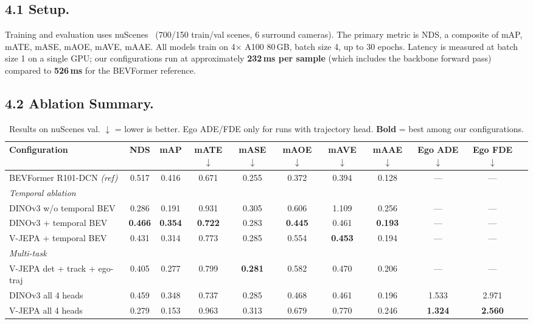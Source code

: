 \documentclass[12pt]{article}
\begin{document}
\subsection{4.1 Setup.}
Training and evaluation uses nuScenes~\cite{nuscenes} (700/150 train/val scenes, 6 surround cameras). The primary metric is NDS, a composite of mAP, mATE, mASE, mAOE, mAVE, mAAE. All models train on 4$\times$ A100 80\,GB, batch size 4, up to 30 epochs. Latency is measured at batch size 1 on a single GPU; our configurations run at approximately \textbf{232\,ms per sample} (which includes the backbone forward pass) compared to \textbf{526\,ms} for the BEVFormer reference.

\subsection{4.2 Ablation Summary.}
 
\begin{table}[h]
\centering
\caption{Results on nuScenes val. $\downarrow$ = lower is better.
  Ego ADE/FDE only for runs with trajectory head.
  \textbf{Bold} = best among our configurations.}
\label{tab:main}
\footnotesize
\setlength{\tabcolsep}{3pt}
\begin{tabular}{lcccccccccc}
\toprule
\textbf{Configuration} & \textbf{NDS} & \textbf{mAP} & \textbf{mATE}$\downarrow$ & \textbf{mASE}$\downarrow$ & \textbf{mAOE}$\downarrow$ & \textbf{mAVE}$\downarrow$ & \textbf{mAAE}$\downarrow$ & \textbf{Ego ADE}$\downarrow$ & \textbf{Ego FDE}$\downarrow$ \\
\midrule
BEVFormer R101-DCN \textit{(ref)}    & 0.517 & 0.416 & 0.671 & 0.255 & 0.372 & 0.394 & 0.128 & ---   & ---   \\
\midrule
\multicolumn{10}{l}{\textit{Temporal ablation}} \\
\quad DINOv3 w/o temporal BEV        & 0.286 & 0.191 & 0.931 & 0.305 & 0.606 & 1.109 & 0.256 & ---   & ---   \\
\quad DINOv3 + temporal BEV          & \textbf{0.466} & \textbf{0.354} & \textbf{0.722} & 0.283 & \textbf{0.445} & 0.461 & \textbf{0.193} & ---   & ---   \\
\quad V-JEPA + temporal BEV          & 0.431 & 0.314 & 0.773 & 0.285 & 0.554 & \textbf{0.453} & 0.194 & ---   & ---   \\
\midrule
\multicolumn{10}{l}{\textit{Multi-task}} \\
\quad V-JEPA det + track + ego-traj  & 0.405 & 0.277 & 0.799 & \textbf{0.281} & 0.582 & 0.470 & 0.206 & ---   & ---   \\
\quad DINOv3 all 4 heads             & 0.459 & 0.348 & 0.737 & 0.285 & 0.468 & 0.461 & 0.196 & 1.533 & 2.971 \\
\quad V-JEPA all 4 heads             & 0.279 & 0.153 & 0.963 & 0.313 & 0.679 & 0.770 & 0.246 & \textbf{1.324} & \textbf{2.560} \\
\bottomrule
\end{tabular}
\end{table}
 
\end{document}
